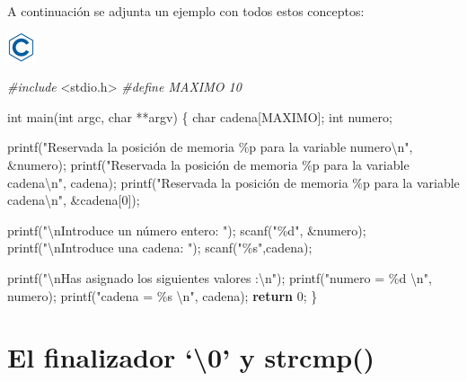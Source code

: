 \documentclass[
]{book}
\newenvironment{Shaded}{\begin{snugshade}}{\end{snugshade}}
\newcommand{\ControlFlowTok}[1]{\textcolor[rgb]{0.13,0.29,0.53}{\textbf{#1}}}
\newcommand{\DataTypeTok}[1]{\textcolor[rgb]{0.13,0.29,0.53}{#1}}
\newcommand{\DecValTok}[1]{\textcolor[rgb]{0.00,0.00,0.81}{#1}}
\newcommand{\ImportTok}[1]{#1}
\newcommand{\NormalTok}[1]{#1}
\newcommand{\PreprocessorTok}[1]{\textcolor[rgb]{0.56,0.35,0.01}{\textit{#1}}}
\newcommand{\SpecialCharTok}[1]{\textcolor[rgb]{0.00,0.00,0.00}{#1}}
\newcommand{\StringTok}[1]{\textcolor[rgb]{0.31,0.60,0.02}{#1}}
\begin{document}
A continuación se adjunta un ejemplo con todos estos conceptos:

\includegraphics{./img/c.png}

\begin{Shaded}
\begin{Highlighting}[]
\PreprocessorTok{\#include }\ImportTok{\textless{}stdio.h\textgreater{}}
\PreprocessorTok{\#define MAXIMO 10}

\DataTypeTok{int}\NormalTok{ main(}\DataTypeTok{int}\NormalTok{ argc, }\DataTypeTok{char}\NormalTok{ **argv) \{}
    \DataTypeTok{char}\NormalTok{ cadena[MAXIMO];}
    \DataTypeTok{int}\NormalTok{ numero;}

\NormalTok{    printf(}\StringTok{"Reservada la posición de memoria \%p para la variable numero}\SpecialCharTok{\textbackslash{}n}\StringTok{"}\NormalTok{, \&numero);}
\NormalTok{    printf(}\StringTok{"Reservada la posición de memoria \%p para la variable cadena}\SpecialCharTok{\textbackslash{}n}\StringTok{"}\NormalTok{, cadena);}
\NormalTok{    printf(}\StringTok{"Reservada la posición de memoria \%p para la variable cadena}\SpecialCharTok{\textbackslash{}n}\StringTok{"}\NormalTok{, \&cadena[}\DecValTok{0}\NormalTok{]);}

\NormalTok{    printf(}\StringTok{"}\SpecialCharTok{\textbackslash{}n}\StringTok{Introduce un número entero: "}\NormalTok{);}
\NormalTok{    scanf(}\StringTok{"\%d"}\NormalTok{, \&numero);}
\NormalTok{    printf(}\StringTok{"}\SpecialCharTok{\textbackslash{}n}\StringTok{Introduce una cadena: "}\NormalTok{);}
\NormalTok{    scanf(}\StringTok{"\%s"}\NormalTok{,cadena);}

\NormalTok{    printf(}\StringTok{"}\SpecialCharTok{\textbackslash{}n}\StringTok{Has asignado los siguientes valores :}\SpecialCharTok{\textbackslash{}n}\StringTok{"}\NormalTok{);}
\NormalTok{    printf(}\StringTok{"numero = \%d }\SpecialCharTok{\textbackslash{}n}\StringTok{"}\NormalTok{, numero);}
\NormalTok{    printf(}\StringTok{"cadena = \%s }\SpecialCharTok{\textbackslash{}n}\StringTok{"}\NormalTok{, cadena);}
    \ControlFlowTok{return} \DecValTok{0}\NormalTok{;}
\NormalTok{\}}
\end{Highlighting}
\end{Shaded}

\hypertarget{el-finalizador-0-y-strcmp}{%
\section{El finalizador `\textbackslash0' y strcmp()}\label{el-finalizador-0-y-strcmp}}
\end{document}
